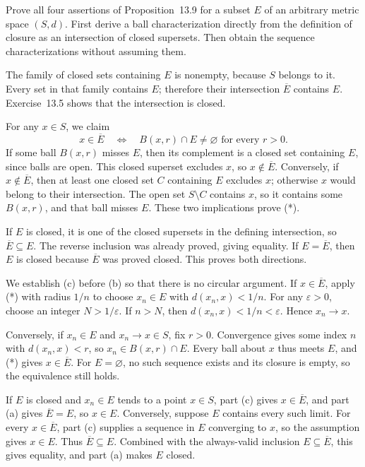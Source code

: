 \goal Prove all four assertions of Proposition~13.9 for a subset
$E$ of an arbitrary metric space $(S,d)$.
\idea First derive a ball characterization directly from the
definition of closure as an intersection of closed supersets.
Then obtain the sequence characterizations without assuming them.

The family of closed sets containing $E$ is nonempty, because
$S$ belongs to it. Every set in that family contains $E$;
therefore their intersection $\overline E$ contains $E$.
Exercise~13.5 shows that the intersection is closed.

For any $x\in S$, we claim
\[
 x\in\overline E
 \quad\Longleftrightarrow\quad
 B(x,r)\cap E\ne\varnothing\text{ for every }r>0.\tag{*}
\]
If some ball $B(x,r)$ misses $E$, then its complement is a
closed set containing $E$, since balls are open. This closed
superset excludes $x$, so $x\notin\overline E$.
Conversely, if $x\notin\overline E$, then at least one closed
set $C$ containing $E$ excludes $x$; otherwise $x$ would belong
to their intersection. The open set $S\setminus C$ contains
$x$, so it contains some $B(x,r)$, and that ball misses $E$.
These two implications prove (*).

If $E$ is closed, it is one of the closed supersets in the
defining intersection, so $\overline E\subseteq E$.
The reverse inclusion was already proved, giving equality.
If $E=\overline E$, then $E$ is closed because $\overline E$
was proved closed. This proves both directions.

We establish (c) before (b) so that there is no circular argument.
If $x\in\overline E$, apply (*) with radius $1/n$ to choose
$x_n\in E$ with $d(x_n,x)<1/n$. For any $\varepsilon>0$,
choose an integer $N>1/\varepsilon$. If $n>N$, then
$d(x_n,x)<1/n<\varepsilon$. Hence $x_n\to x$.

Conversely, if $x_n\in E$ and $x_n\to x\in S$, fix $r>0$.
Convergence gives some index $n$ with $d(x_n,x)<r$, so
$x_n\in B(x,r)\cap E$. Every ball about $x$ thus meets $E$,
and (*) gives $x\in\overline E$. For $E=\varnothing$, no such
sequence exists and its closure is empty, so the equivalence
still holds.

If $E$ is closed and $x_n\in E$ tends to a point $x\in S$,
part (c) gives $x\in\overline E$, and part (a) gives
$\overline E=E$, so $x\in E$.
Conversely, suppose $E$ contains every such limit. For every
$x\in\overline E$, part (c) supplies a sequence in $E$
converging to $x$, so the assumption gives $x\in E$.
Thus $\overline E\subseteq E$. Combined with the always-valid
inclusion $E\subseteq\overline E$, this gives equality, and
part (a) makes $E$ closed.

